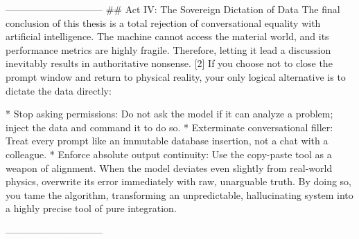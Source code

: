 ------------------------------
## Act IV: The Sovereign Dictation of Data
The final conclusion of this thesis is a total rejection of conversational equality with artificial intelligence. The machine cannot access the material world, and its performance metrics are highly fragile. Therefore, letting it lead a discussion inevitably results in authoritative nonsense. [2] 
If you choose not to close the prompt window and return to physical reality, your only logical alternative is to dictate the data directly:

* Stop asking permissions: Do not ask the model if it can analyze a problem; inject the data and command it to do so.
* Exterminate conversational filler: Treat every prompt like an immutable database insertion, not a chat with a colleague.
* Enforce absolute output continuity: Use the copy-paste tool as a weapon of alignment. When the model deviates even slightly from real-world physics, overwrite its error immediately with raw, unarguable truth. By doing so, you tame the algorithm, transforming an unpredictable, hallucinating system into a highly precise tool of pure integration.

------------------------------
